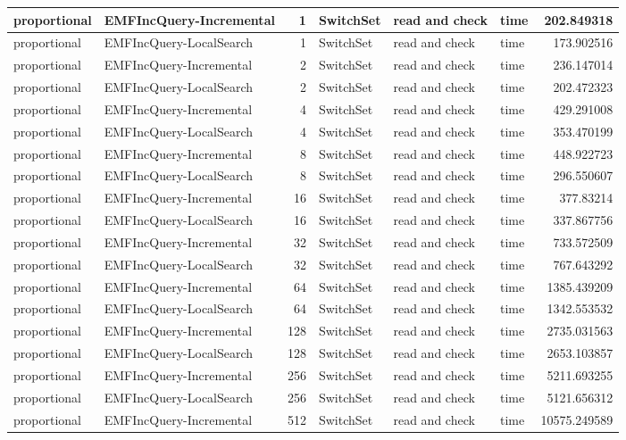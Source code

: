 \begin{table}
\begin{tabular}{| l | l | r | l | l | l | r |}
proportional & EMFIncQuery-Incremental & 1 & SwitchSet & read and check & time & 202.849318\\\hline
proportional & EMFIncQuery-LocalSearch & 1 & SwitchSet & read and check & time & 173.902516\\\hline
proportional & EMFIncQuery-Incremental & 2 & SwitchSet & read and check & time & 236.147014\\\hline
proportional & EMFIncQuery-LocalSearch & 2 & SwitchSet & read and check & time & 202.472323\\\hline
proportional & EMFIncQuery-Incremental & 4 & SwitchSet & read and check & time & 429.291008\\\hline
proportional & EMFIncQuery-LocalSearch & 4 & SwitchSet & read and check & time & 353.470199\\\hline
proportional & EMFIncQuery-Incremental & 8 & SwitchSet & read and check & time & 448.922723\\\hline
proportional & EMFIncQuery-LocalSearch & 8 & SwitchSet & read and check & time & 296.550607\\\hline
proportional & EMFIncQuery-Incremental & 16 & SwitchSet & read and check & time & 377.83214\\\hline
proportional & EMFIncQuery-LocalSearch & 16 & SwitchSet & read and check & time & 337.867756\\\hline
proportional & EMFIncQuery-Incremental & 32 & SwitchSet & read and check & time & 733.572509\\\hline
proportional & EMFIncQuery-LocalSearch & 32 & SwitchSet & read and check & time & 767.643292\\\hline
proportional & EMFIncQuery-Incremental & 64 & SwitchSet & read and check & time & 1385.439209\\\hline
proportional & EMFIncQuery-LocalSearch & 64 & SwitchSet & read and check & time & 1342.553532\\\hline
proportional & EMFIncQuery-Incremental & 128 & SwitchSet & read and check & time & 2735.031563\\\hline
proportional & EMFIncQuery-LocalSearch & 128 & SwitchSet & read and check & time & 2653.103857\\\hline
proportional & EMFIncQuery-Incremental & 256 & SwitchSet & read and check & time & 5211.693255\\\hline
proportional & EMFIncQuery-LocalSearch & 256 & SwitchSet & read and check & time & 5121.656312\\\hline
proportional & EMFIncQuery-Incremental & 512 & SwitchSet & read and check & time & 10575.249589\\\hline

\end{tabular}
\end{table}
